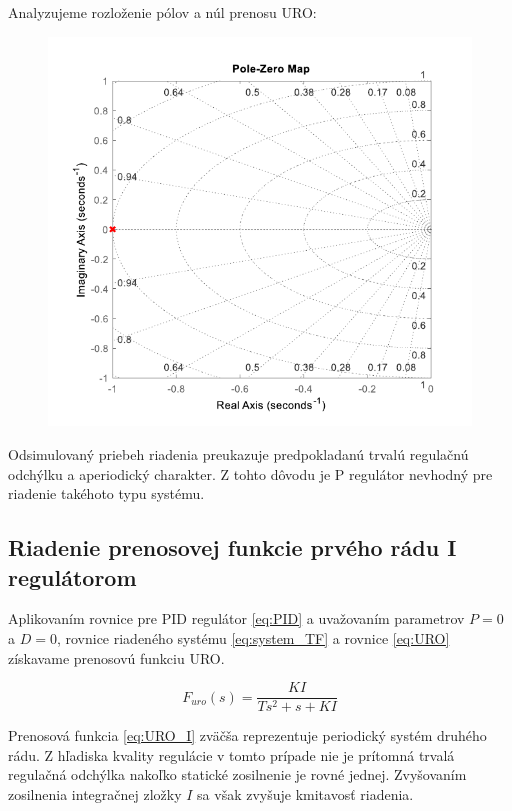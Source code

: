 \documentclass[a4paper,10pt]{article}
\begin{document}
Analyzujeme rozloženie pólov a núl prenosu URO:
\begin{figure}[ht]
\centering
\includegraphics[scale=0.75]{pzmap_P}
\end{figure}

Odsimulovaný priebeh riadenia preukazuje predpokladanú trvalú regulačnú odchýlku a aperiodický charakter.
Z tohto dôvodu je P regulátor nevhodný pre riadenie takéhoto typu systému.

\pagebreak

\subsection{Riadenie prenosovej funkcie prvého rádu I regulátorom}

Aplikovaním rovnice pre PID regulátor \eqref{eq:PID} a uvažovaním parametrov $P=0$ a $D=0$, rovnice riadeného systému \eqref{eq:system_TF} a rovnice \eqref{eq:URO} získavame prenosovú funkciu URO.

\begin{equation}
\label{eq:URO_I}
F_{uro}(s)=\frac{KI}{Ts^2+s+KI}
\end{equation}

Prenosová funkcia \eqref{eq:URO_I} zväčša reprezentuje periodický systém druhého rádu. Z hľadiska kvality regulácie v tomto prípade nie je prítomná trvalá regulačná odchýlka nakoľko statické zosilnenie je rovné jednej.
Zvyšovaním zosilnenia integračnej zložky $I$ sa však zvyšuje kmitavosť riadenia.
\end{document}
